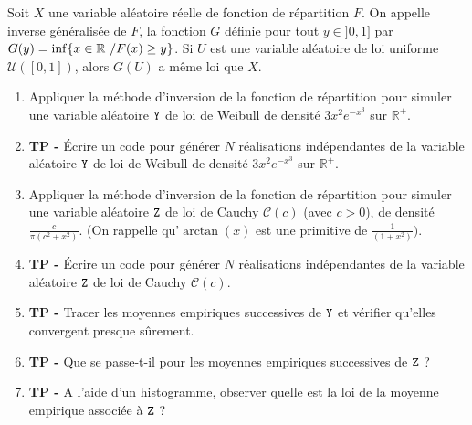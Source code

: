 \documentclass{exercices}
\begin{document}
Soit $X$ une variable al\'eatoire r\'eelle de fonction de
r\'epartition $F$. On appelle inverse g\'en\'eralis\'ee de $F$, la
fonction $G$ d\'efinie pour tout $y\in ]0,1]$ par
$G(y)=\inf\{x\in \mathbb{R} \ / F(x)\geq y \}$.
Si $U$ est une variable al\'eatoire
de loi uniforme ${\mathcal U}([0,1])$, alors $G(U)$ a m\^eme loi que $X$.

\begin{exercice}
\begin{enumerate}
\item Appliquer la méthode d'inversion de la fonction de répartition pour simuler une variable al\'eatoire $\tt Y$ de loi de Weibull de densité $3x^{2} e^{-x^3}$ sur $\mathbb{R}^+$.
\item \textbf{TP -} Écrire un code pour g\'en\'erer
$N$ r\'ealisations  ind\'ependantes de la variable al\'eatoire
$\tt Y$ de loi de Weibull de densité $3x^{2} e^{-x^3}$ sur $\mathbb{R}^+$.
\item Appliquer la méthode d'inversion de la fonction de répartition pour simuler une variable al\'eatoire $\tt Z$ de loi de Cauchy ${\mathcal C}(c)$ (avec $c>0$), de densité $\frac{c}{\pi(c^2+x^2)}$. (On rappelle qu'$\arctan(x)$ est une primitive de $\frac{1}{(1+x^2)}).$
\item \textbf{TP -} Écrire un code pour g\'en\'erer $N$ r\'ealisations  ind\'ependantes de la variable al\'eatoire $\tt Z$ de loi de Cauchy ${\mathcal C}(c)$.
\item \textbf{TP -} Tracer les moyennes empiriques successives de $\tt Y$ et v\'erifier qu'elles convergent presque sûrement.
\item \textbf{TP -} Que se passe-t-il pour les moyennes empiriques successives de $\tt Z$ ?
\item \textbf{TP -} A l'aide d'un histogramme, observer quelle est la loi de la moyenne empirique associ\'ee \`a $\tt Z$ ?
\end{enumerate}
\end{exercice}
\end{document}
